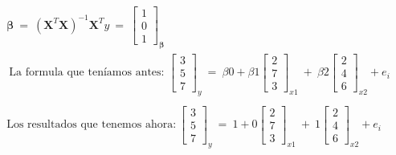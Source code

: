 \documentclass[10pt]{article}
\begin{document}
\begin{gather*}
\boldsymbol{\beta} \ =\ \left( \boldsymbol{X}^{T} \boldsymbol{X}\right)^{-1} \boldsymbol{X}^{T} y\ =\ \begin{bmatrix}
1\\
0\\
1
\end{bmatrix}_{\boldsymbol{\beta}}\\
\ \text{La formula que ten\'iamos antes: }\begin{bmatrix}
3\\
5\\
7
\end{bmatrix}_{y} \ =\ \beta 0+\beta 1\begin{bmatrix}
2\\
7\\
3
\end{bmatrix}_{x1} \ +\ \beta 2\begin{bmatrix}
2\\
4\\
6
\end{bmatrix}_{x2} +e_{i}\\
\\
\text{Los resultados que tenemos ahora:} \ \begin{bmatrix}
3\\
5\\
7
\end{bmatrix}_{y} \ =\ 1+0\begin{bmatrix}
2\\
7\\
3
\end{bmatrix}_{x1} \ +\ 1\begin{bmatrix}
2\\
4\\
6
\end{bmatrix}_{x2} +e_{i}\\
\end{gather*}
\end{document}
